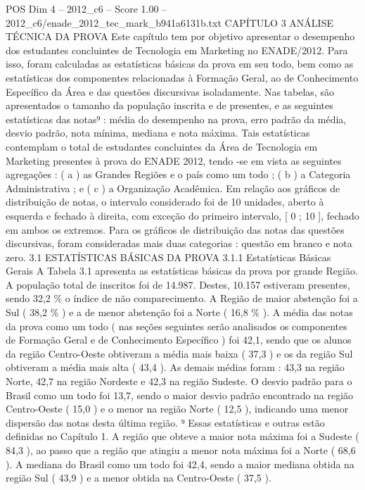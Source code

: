 \begin{textsample}{POS Dim 4 – 2012\_c6 – Score 1.00 – 2012\_c6/enade\_2012\_tec\_mark\_b941a6131b.txt}  \label{ex:f4_pos_130}
CAPÍTULO 3 ANÁLISE TÉCNICA DA PROVA Este capítulo tem por objetivo apresentar o desempenho dos estudantes concluintes de Tecnologia em Marketing no ENADE/2012.
Para isso, foram calculadas as estatísticas básicas da prova em seu todo, bem como as estatísticas dos componentes relacionadas à Formação Geral, ao de Conhecimento Específico da Área e das questões discursivas isoladamente.
Nas tabelas, são apresentados o tamanho da população inscrita e de presentes, e as seguintes estatísticas das notas⁹ : média do desempenho na prova, erro padrão da média, desvio padrão, nota mínima, mediana e nota máxima.
Tais estatísticas contemplam o total de estudantes concluintes da Área de Tecnologia em Marketing presentes à prova do ENADE 2012, tendo -se em vista as seguintes agregações : ( a ) as Grandes Regiões e o país como um todo ; ( b ) a Categoria Administrativa ; e ( c ) a Organização Acadêmica.
Em relação aos gráficos de distribuição de notas, o intervalo considerado foi de 10 unidades, aberto à esquerda e fechado à direita, com exceção do primeiro intervalo, [ 0 ; 10 ], fechado em ambos os extremos.
Para os gráficos de distribuição das notas das questões discursivas, foram consideradas mais duas categorias : questão em branco e nota zero. 3.1 ESTATÍSTICAS BÁSICAS DA PROVA 3.1.1 Estatísticas Básicas Gerais A Tabela 3.1 apresenta as estatísticas básicas da prova por grande Região.
A população total de inscritos foi de 14.987.
Destes, 10.157 estiveram presentes, sendo 32,2 \% o índice de não comparecimento.
A Região de maior abstenção foi a Sul ( 38,2 \% ) e a de menor abstenção foi a Norte ( 16,8 \% ).
A média das notas da prova como um todo ( nas seções seguintes serão analisados os componentes de Formação Geral e de Conhecimento Específico ) foi 42,1, sendo que os alunos da região Centro-Oeste obtiveram a média mais baixa ( 37,3 ) e os da região Sul obtiveram a média mais alta ( 43,4 ).
As demais médias foram : 43,3 na região Norte, 42,7 na região Nordeste e 42,3 na região Sudeste.
O desvio padrão para o Brasil como um todo foi 13,7, sendo o maior desvio padrão encontrado na região Centro-Oeste ( 15,0 ) e o menor na região Norte ( 12,5 ), indicando uma menor dispersão das notas desta última região. ⁹ Essas estatísticas e outras estão definidas no Capítulo 1.
A região que obteve a maior nota máxima foi a Sudeste ( 84,3 ), ao passo que a região que atingiu a menor nota máxima foi a Norte ( 68,6 ).
A mediana do Brasil como um todo foi 42,4, sendo a maior mediana obtida na região Sul ( 43,9 ) e a menor obtida na Centro-Oeste ( 37,5 ).

\end{textsample}
